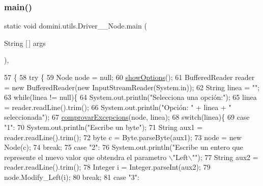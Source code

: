 \subsubsection{\texorpdfstring{main()}{main()}}
{\footnotesize\ttfamily static void domini.\+utils.\+Driver\+\_\+\+\_\+\+Node.\+main (\begin{DoxyParamCaption}\item[{String \mbox{[}$\,$\mbox{]}}]{args }\end{DoxyParamCaption})\hspace{0.3cm}{\ttfamily [inline]}, {\ttfamily [static]}}


\begin{DoxyCode}
57                                            \{
58     \textcolor{keywordflow}{try} \{
59         Node node = null;
60         \hyperlink{classdomini_1_1utils_1_1Driver____Node_a3e1022f470676f7cbbeb44b9b2d4f66f}{showOptions}();
61         BufferedReader reader = \textcolor{keyword}{new} BufferedReader(\textcolor{keyword}{new} InputStreamReader(System.in));
62         String linea = \textcolor{stringliteral}{""};
63         \textcolor{keywordflow}{while}(linea != null)\{
64             System.out.println(\textcolor{stringliteral}{"Selecciona una opción:"});
65             linea = reader.readLine().trim();
66             System.out.println(\textcolor{stringliteral}{"Opción: "} + linea + \textcolor{stringliteral}{" seleccionada"});
67             \hyperlink{classdomini_1_1utils_1_1Driver____Node_a9fdd311953250227bb70d67cbf20bbb4}{comprovarExcepcions}(node, linea);
68             \textcolor{keywordflow}{switch}(linea)\{
69                 \textcolor{keywordflow}{case} \textcolor{stringliteral}{"1"}:
70                     System.out.println(\textcolor{stringliteral}{"Escribe un byte"});
71                     String aux1 = reader.readLine().trim();
72                     byte c = Byte.parseByte(aux1);
73                     node = \textcolor{keyword}{new} Node(c);
74                 \textcolor{keywordflow}{break};
75                 \textcolor{keywordflow}{case} \textcolor{stringliteral}{"2"}:
76                     System.out.println(\textcolor{stringliteral}{"Escribe un entero que represente el nuevo valor que obtendra el
       parametro \(\backslash\)"Left\(\backslash\)""});
77                     String aux2 = reader.readLine().trim();
78                     Integer i = Integer.parseInt(aux2);
79                     node.Modify\_Left(i);
80                 \textcolor{keywordflow}{break};
81                 \textcolor{keywordflow}{case} \textcolor{stringliteral}{"3"}:

\end{DoxyCode}
